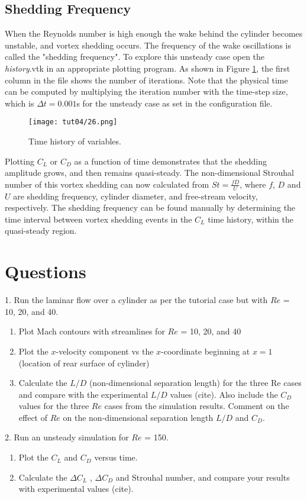 \subsection{Shedding Frequency}
When the Reynolds number is high enough the wake behind the cylinder becomes unstable, and vortex shedding occurs. The frequency of the wake oscillations is called the "shedding frequency". To explore this unsteady case open the \textit{history}.vtk in an appropriate plotting program. As shown in Figure \ref{fig4:time_history}, the first column in the file shows the number of iterations. Note that the physical time can be computed by multiplying the iteration number with the time-step size, which is $\Delta t = 0.001$s for the unsteady case as set in the configuration file.
\begin{figure}[htbp]
    \centering
    \texttt{[image: tut04/26.png]}
    \caption{Time history of variables.}
    \label{fig4:time_history}
\end{figure}
Plotting $C_L$ or $C_D$ as a function of time demonstrates that the shedding amplitude grows, and then remains quasi-steady. The non-dimensional Strouhal number of this vortex shedding can now calculated from $St=\frac{f D}{U}$, where $f$, $D$ and $U$ are shedding frequency, cylinder diameter, and free-stream velocity, respectively. The shedding frequency can be found manually by determining the time interval between vortex shedding events in the $C_L$ time history, within the quasi-steady region.
\clearpage
\section{Questions}
1. Run the laminar flow over a cylinder as per the tutorial case but with $Re$ = 10, 20, and 40.
\begin{enumerate}[label=(\alph*)]
    \item Plot Mach contours with streamlines for $Re$ = 10, 20, and 40
    \item Plot the $x$-velocity component vs the $x$-coordinate beginning at $x = 1$ (location of rear surface of cylinder)
    \item Calculate the $L/D$ (non-dimensional separation length) for the three Re cases and compare with the experimental $L/D$ values (cite). Also include the $C_D$ values for the three $Re$ cases from the simulation results. Comment on the effect of $Re$ on the non-dimensional separation length $L/D$ and $C_D$.
\end{enumerate}
2. Run an unsteady simulation for $Re$ = 150.
\begin{enumerate}[label=(\alph*)]
    \item Plot the $C_L$ and $C_D$ versus time.
    \item Calculate the $\Delta C_L$ , $\Delta C_D$ and Strouhal number, and compare your results with experimental values (cite).
\end{enumerate}
